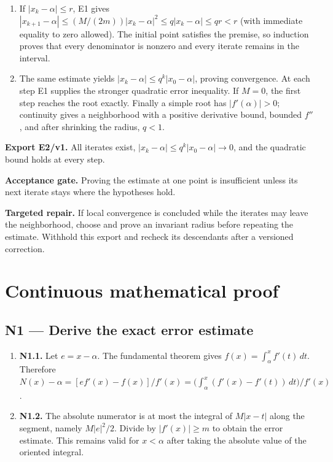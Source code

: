 \documentclass[preprint,12pt,aps,pra,showkeys,amsmath,amssymb,superscriptaddress,floatfix]{revtex4-2}
\theoremstyle{definition}
\theoremstyle{remark}
\newcommand{\field}[2]{\par\smallskip\noindent\textbf{#1.} #2\par}
\begin{document}
\begin{enumerate}[label=N2.\arabic*,leftmargin=3.4em]

\item If \(|x_k-\alpha|\le r\), E1 gives
\(|x_{k+1}-\alpha|\le(M/(2m))|x_k-\alpha|^2\le q|x_k-\alpha|\le qr<r\)
(with immediate equality to zero allowed). The initial point satisfies
the premise, so induction proves that every denominator is nonzero and
every iterate remains in the interval.

\item The same estimate yields \(|x_k-\alpha|\le q^k|x_0-\alpha|\), proving
convergence. At each step E1 supplies the stronger quadratic error
inequality. If \(M=0\), the first step reaches the root exactly. Finally
a simple root has \(|f'(\alpha)|>0\); continuity gives a neighborhood
with a positive derivative bound, bounded \(f''\), and after shrinking
the radius, \(q<1\).

\end{enumerate}

\field{Export E2/v1}{All iterates exist, \(|x_k-\alpha|\le q^k|x_0-\alpha|\to0\), and the
quadratic bound holds at every step.}

\field{Acceptance gate}{Proving the estimate at one point is insufficient unless its next
iterate stays where the hypotheses hold.}

\field{Targeted repair}{If local convergence is concluded while the iterates may leave the
neighborhood, choose and prove an invariant radius before repeating the
estimate. Withhold this export and recheck its descendants after a
versioned correction.}

\endgroup\clearpage\section{Continuous mathematical proof}\label{sec:proof}

\subsection{N1 --- Derive the exact error
estimate}\label{n1-derive-the-exact-error-estimate}

\begin{enumerate}
\def\labelenumi{\arabic{enumi}.}
\item
  \textbf{N1.1.} Let \(e=x-\alpha\). The fundamental theorem gives
  \(f(x)=\int_\alpha^x f'(t)\,dt\). Therefore
  \(N(x)-\alpha=[e f'(x)-f(x)]/f'(x)=\bigl(\int_\alpha^x(f'(x)-f'(t))\,dt\bigr)/f'(x)\).
\item
  \textbf{N1.2.} The absolute numerator is at most the integral of
  \(M|x-t|\) along the segment, namely \(M|e|^2/2\). Divide by
  \(|f'(x)|\ge m\) to obtain the error estimate. This remains valid for
  \(x<\alpha\) after taking the absolute value of the oriented integral.
\end{enumerate}
\end{document}
